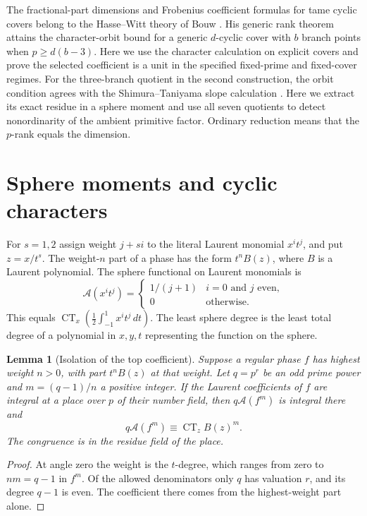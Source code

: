 \documentclass[11pt]{article}
\newtheorem{lemma}[theorem]{Lemma}
\newcommand{\A}{\mathcal A}
\newcommand{\CT}{\operatorname{CT}}
\begin{document}
The fractional-part dimensions and Frobenius coefficient formulas for
tame cyclic covers belong to the Hasse--Witt theory of Bouw
\cite[\S\S2, 4--5]{bouw}. His generic rank theorem
\cite[Theorem~6.1]{bouw} attains the character-orbit bound for a
generic \(d\)-cyclic cover with \(b\) branch points when
\(p\ge d(b-3)\). Here we use the character calculation on explicit
covers and prove the selected coefficient is a unit in the specified
fixed-prime and fixed-cover regimes. For the three-branch quotient in
the second construction, the orbit condition agrees with the
Shimura--Taniyama slope calculation \cite[Theorem~3.2]{lmpt}. Here
we extract its exact residue in a sphere moment and use all seven
quotients to detect nonordinarity of the ambient primitive factor.
Ordinary reduction means that the \(p\)-rank equals the dimension.

\section{Sphere moments and cyclic characters}

For \(s=1,2\) assign weight \(j+si\) to the literal Laurent monomial
\(x^it^j\), and put \(z=x/t^s\). The weight-\(n\) part of a phase has
the form \(t^n B(z)\), where \(B\) is a Laurent polynomial. The
sphere functional on Laurent monomials is
\[
  \A(x^it^j)=
  \begin{cases}
  1/(j+1)& i=0\text{ and }j\text{ even},\\
  0&\text{otherwise}.
  \end{cases}
\]
This equals \(\CT_x(\tfrac12\int_{-1}^1 x^it^j\,dt)\). The least sphere
degree is the least total degree of a polynomial in \(x,y,t\)
representing the function on the sphere.

\begin{lemma}[Isolation of the top coefficient]\label{lem:isolation}
Suppose a regular phase \(f\) has highest weight \(n>0\), with part
\(t^n B(z)\) at that weight. Let \(q=p^r\) be an odd prime power and
\(m=(q-1)/n\) a positive integer. If the Laurent coefficients of \(f\)
are integral at a place over \(p\) of their number field, then
\(q\A(f^m)\) is integral there and
\[
                 q\A(f^m)\equiv \CT_z B(z)^m.
\]
The congruence is in the residue field of the place.
\end{lemma}

\begin{proof}
At angle zero the weight is the \(t\)-degree, which ranges from zero
to \(nm=q-1\) in \(f^m\). Of the allowed denominators only \(q\)
has valuation \(r\), and its degree \(q-1\) is even. The coefficient
there comes from the highest-weight part alone.
\end{proof}
\end{document}
